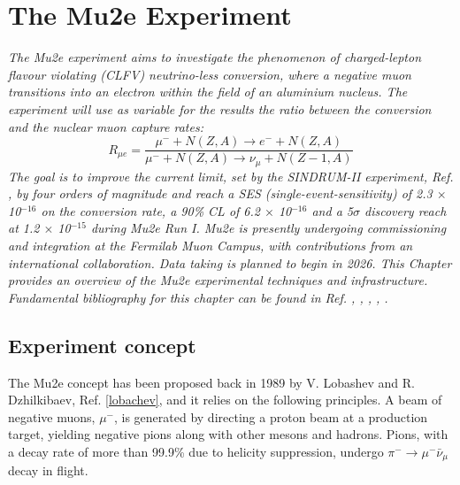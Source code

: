 \chapter{The Mu2e Experiment}\label{mu2echapter}
\textit{
The Mu2e experiment aims to investigate the phenomenon of charged-lepton flavour 
violating (CLFV) neutrino-less conversion, where a negative muon transitions into 
an electron within the field of an aluminium nucleus. The experiment will use as variable for the results 
the ratio between the conversion and the nuclear muon capture rates:
\begin{equation}\label{rmue}
R_{\mu e}=\frac{\mu^{-}+N(Z, A) \rightarrow e^{-}+N(Z, A)}{\mu^{-}+N(Z, A) \rightarrow \nu_\mu+N(Z-1, A)}
\end{equation}
The goal is to improve the current limit, set by the SINDRUM-II experiment, 
Ref. \cite{SINDRUMII:2006dvw}, by
four orders of magnitude and reach a SES (single-event-sensitivity) of 2.3 $\times$ 
10$^{-16}$ on the
conversion rate, a 90\% CL of 6.2 $\times$ 10$^{-16}$ and a 5$\sigma$ discovery 
reach at 1.2 $\times$ 10$^{-15}$ during Mu2e Run I.
Mu2e is presently undergoing commissioning and integration at the 
Fermilab Muon Campus, 
with contributions from an international collaboration. Data taking is planned to 
begin in 2026. 
This Chapter provides an overview of the Mu2e experimental techniques and infrastructure. 
Fundamental bibliography for this chapter can be found in Ref. \cite{bartoszek2015mu2e}, 
\cite{bobbb}, \cite{Bernstein_2013}, \cite{Kargiantoulakis_2020}, \cite{universe9010054}.}

\section{Experiment concept}
The Mu2e concept has been proposed back in 1989 by V. Lobashev and R. Dzhilkibaev, Ref. \ref{lobachev}, 
and it relies on the following principles. 
A beam of negative muons, $\mu ^-$, is generated by directing a proton beam at a 
production target, yielding negative pions along with other mesons and hadrons. 
Pions, with a decay rate of more than 99.9\% due to helicity suppression, undergo 
$\pi ^- \rightarrow \mu ^- \bar{\nu}_\mu$ decay in flight. 

